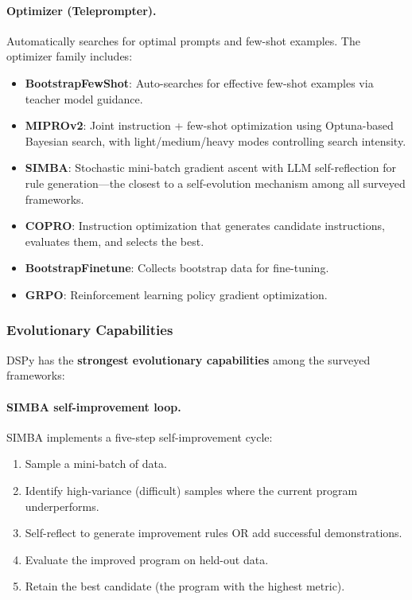\paragraph{Optimizer (Teleprompter).}
Automatically searches for optimal prompts and few-shot examples. The optimizer family includes:
\begin{itemize}
    \item \textbf{BootstrapFewShot}: Auto-searches for effective few-shot examples via teacher model guidance.
    \item \textbf{MIPROv2}: Joint instruction + few-shot optimization using Optuna-based Bayesian search, with light/medium/heavy modes controlling search intensity.
    \item \textbf{SIMBA}: Stochastic mini-batch gradient ascent with LLM self-reflection for rule generation---the closest to a self-evolution mechanism among all surveyed frameworks.
    \item \textbf{COPRO}: Instruction optimization that generates candidate instructions, evaluates them, and selects the best.
    \item \textbf{BootstrapFinetune}: Collects bootstrap data for fine-tuning.
    \item \textbf{GRPO}: Reinforcement learning policy gradient optimization.
\end{itemize}

\subsubsection{Evolutionary Capabilities}

DSPy has the \textbf{strongest evolutionary capabilities} among the surveyed frameworks:

\paragraph{SIMBA self-improvement loop.}
SIMBA implements a five-step self-improvement cycle:
\begin{enumerate}
    \item Sample a mini-batch of data.
    \item Identify high-variance (difficult) samples where the current program underperforms.
    \item Self-reflect to generate improvement rules OR add successful demonstrations.
    \item Evaluate the improved program on held-out data.
    \item Retain the best candidate (the program with the highest metric).
\end{enumerate}


